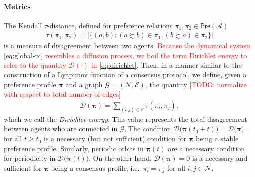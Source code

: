 \documentclass[conference]{ieeeconf}
\newcommand{\N}{\mathcal{N}}
\newcommand{\A}{\mathcal{A}}
\newcommand{\G}{\mathcal{G}}
\newcommand{\E}{\mathcal{E}}
\newcommand{\D}{\mathcal{D}}
\newcommand{\Pref}{\mathsf{Pre}}
\newcommand{\prefers}{\succsim}
\newcommand{\profile}{\boldsymbol{\pi}}
\renewcommand{\geq}{\geqslant}
\begin{document}
\paragraph*{Metrics}
The Kendall $\tau$-distance, defined for preference relations $\pi_1, \pi_2 \in \Pref(\A)$
\begin{align}
        \tau(\pi_1,\pi_2) = \big\vert \{ (a,b) : (a \prefers b) \in \pi_1, (b \prefers a) \in \pi_2  \} \big\vert \label{eq:kendall}
    \end{align}
is a measure of disagreement between two agents.
\textcolor{red}{Because the dynamical system \eqref{eq:global-pi} resembles a diffusion process, we boil the term Dirichlet energy to refer to the quantity $\D(\cdot)$ in \eqref{eq:dirichlet}.}
Then, in a manner similar to the construction of a Lyapunov function of a consensus protocol, we define, given a preference profile $\profile$ and a graph $\G = (\N,\E)$, the quantity \textcolor{red}{[TODO: normalize with respect to total number of edges]}
\begin{align}
    \D(\profile) = \sum_{(i,j) \in \E} \tau(\pi_i,\pi_j), \label{eq:dirichlet}
\end{align}
which we call the \emph{Dirichlet energy}. This value represents the total disagreement between agents who are connected in $\G$. The condition $\D\bigl(\profile(t_0+t)\bigr) = \D\bigl(\profile\bigr) =$ for all $t \geq t_0$ is a necessary (but not sufficient) condition for $\profile$ being a stable preference profile. Similarly, periodic orbits in $\profile(t)$ are a necessary condition for periodicity in $\D\bigl( \profile(t)\bigr)$. On the other hand, $\D(\profile) = 0$ is a necessary and sufficient for $\profile$ being a consensus profile, i.e.~$\pi_i = \pi_j$ for all $i,j \in \N$.
\end{document}
